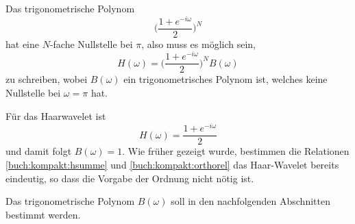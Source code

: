 Das trigonometrische Polynom
\[
\biggl(
\frac{1+e^{-i\omega}}{2}
\biggr)^N
\]
hat eine $N$-fache Nullstelle bei $\pi$, also muss es möglich sein,
\begin{equation}
H(\omega)
= 
\biggl(
\frac{1+e^{-i\omega}}{2}
\biggr)^N B(\omega)
\label{buch:kompakt:HB}
\end{equation}
zu schreiben, wobei $B(\omega)$ ein trigonometrisches Polynom ist,
welches keine Nullstelle bei $\omega=\pi$ hat.

\begin{beispiel}
Für das Haarwavelet ist
\[
H(\omega)
=
\frac{ 1+e^{-i\omega}}2
\]
und damit folgt $B(\omega)=1$.
Wie früher gezeigt wurde, bestimmen die Relationen 
\eqref{buch:kompakt:hsumme} und \eqref{buch:kompakt:orthorel}
das Haar-Wavelet bereits eindeutig, so dass die Vorgabe der Ordnung
nicht nötig ist.
\end{beispiel}

Das trigonometrische Polynom $B(\omega)$ soll in den nachfolgenden
Abschnitten bestimmt werden.


